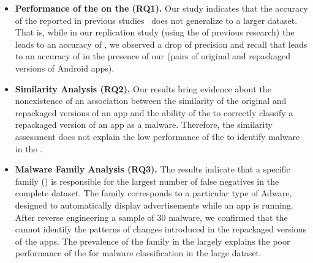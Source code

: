 \begin{itemize}
\item \textbf{Performance of the \mas on the \cds (RQ1).} 
  Our study indicates that the accuracy of the \mas reported in
  previous studies~\cite{DBLP:conf/wcre/BaoLL18,DBLP:journals/jss/CostaMMSSBNR22} does not
  generalize to a larger dataset. That is, while in our
  replication study (using the \sds of previous research) the \mas
  leads to an accuracy of \fscoreSmall, we observed a drop of precision and recall
  that leads to an accuracy of \fscore in the presence of our \cds (\apps pairs of
  original and repackaged versions of Android apps). 


\item \textbf{Similarity Analysis (RQ2).} Our results bring evidence about the nonexistence of an 
  association between the similarity of the original and repackaged versions of an app
  and the ability of the \mas to correctly
  classify a repackaged version of an app as a malware. Therefore,
  the similarity assessment does not explain the low
  performance of the \mas to identify malware in the \cds.

\item \textbf{Malware Family Analysis (RQ3).} The results indicate that a specific family
  (\gps)  is responsible for the largest number of false
  negatives in the complete dataset. The \gps family corresponds to a particular type of
  Adware, designed to automatically display advertisements while an app is running. After reverse engineering
  a sample of 30 \gps malware, we confirmed that the \mas cannot identify the
  patterns of changes introduced in the repackaged versions of the apps. The prevalence of the \gps family
  in the \cds largely explains the poor performance of the \mas for malware classification in the large dataset. 
\end{itemize}

